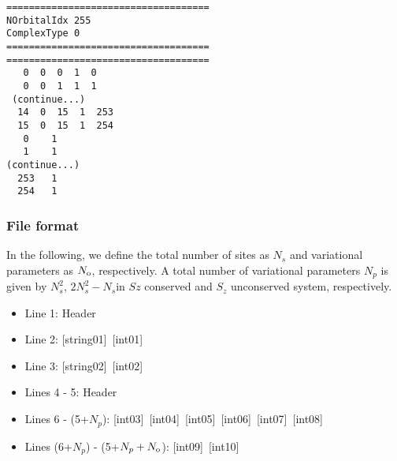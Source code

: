 \begin{minipage}{12.5cm}
\begin{screen}
\begin{verbatim}
====================================
NOrbitalIdx 255
ComplexType 0
====================================
====================================
   0  0  0  1  0
   0  0  1  1  1 
 (continue...)
  14  0  15  1  253
  15  0  15  1  254
   0    1 
   1    1 
(continue...)
  253   1 
  254   1 
\end{verbatim}
\end{screen}
\end{minipage}

\subsubsection{File format}
In the following, we define the total number of sites as $N_s$ and variational parameters as $N_{\rm o}$, respectively.  
A total number of variational parameters $N_p$ is given by $N_s^2$, $2 N_s^2 -N_s$in $Sz$ conserved and $S_z$ unconserved system, respectively.

 \begin{itemize}
   \item  Line 1: Header
   \item  Line 2: [string01]~[int01]
   \item  Line 3: [string02]~[int02]
   \item  Lines 4 - 5:  Header
   \item  Lines 6 - (5+$N_p$): [int03]~[int04]~[int05]~[int06]~[int07]~[int08]
   \item  Lines (6+$N_p$) - (5+$N_p+N_{\rm o}$): [int09]~[int10]
  \end{itemize}
